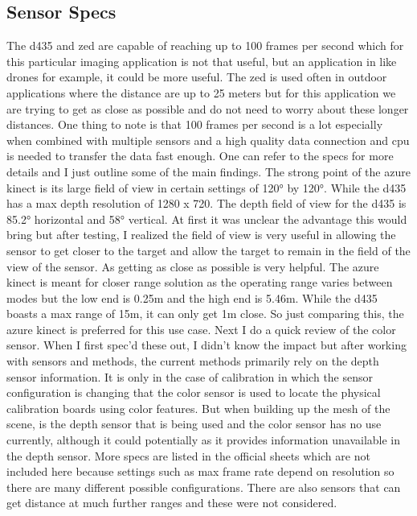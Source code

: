 \subsection{Sensor Specs}
The d435 and zed are capable of reaching up to 100 frames per second which for this particular imaging application is not that useful, but an application in like drones for example, it could be more useful. The zed is used often in outdoor applications where the distance are up to 25 meters but for this application we are trying to get as close as possible and do not need to worry about these longer distances. One thing to note is that 100 frames per second is a lot especially when combined with multiple sensors and a high quality data connection and cpu is needed to transfer the data fast enough. One can refer to the specs for more details and I just outline some of the main findings. The strong point of the azure kinect is its large field of view in certain settings of \ang{120} by \ang{120}. While the d435 has a max depth resolution of 1280 x 720. The depth field of view for the d435 is \ang{85.2} horizontal and \ang{58} vertical. At first it was unclear the advantage this would bring but after testing, I realized the field of view is very useful in allowing the sensor to get closer to the target and allow the target to remain in the field of the view of the sensor. As getting as close as possible is very helpful. The azure kinect is meant for closer range solution as the operating range varies between modes but the low end is 0.25m and the high end is 5.46m. While the d435 boasts a max range of 15m, it can only get 1m close. So just comparing this, the azure kinect is preferred for this use case. Next I do a quick review of the color sensor. When I first spec'd these out, I didn't know the impact but after working with sensors and methods, the current methods primarily rely on the depth sensor information. It is only in the case of calibration in which the sensor configuration is changing that the color sensor is used to locate the physical calibration boards using color features. But when building up the mesh of the scene, is the depth sensor that is being used and the color sensor has no use currently, although it could potentially as it provides information unavailable in the depth sensor. More specs are listed in the official sheets which are not included here because settings such as max frame rate depend on resolution so there are many different possible configurations. There are also sensors that can get distance at much further ranges and these were not considered.


